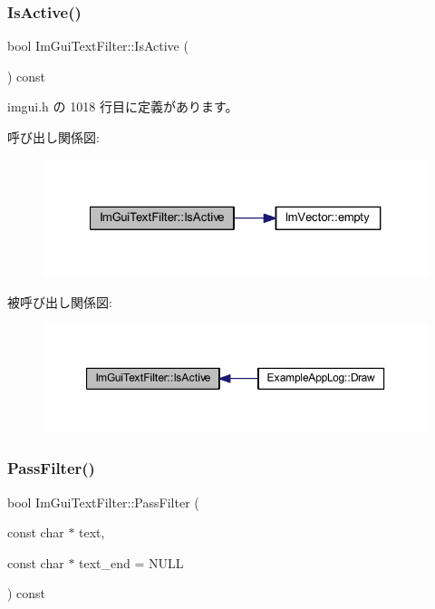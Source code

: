 \subsubsection{\texorpdfstring{Is\+Active()}{IsActive()}}
{\footnotesize\ttfamily bool Im\+Gui\+Text\+Filter\+::\+Is\+Active (\begin{DoxyParamCaption}{ }\end{DoxyParamCaption}) const\hspace{0.3cm}{\ttfamily [inline]}}



 imgui.\+h の 1018 行目に定義があります。

呼び出し関係図\+:\nopagebreak
\begin{figure}[H]
\begin{center}
\leavevmode
\includegraphics[width=327pt]{struct_im_gui_text_filter_a493158f2ab8f45fcf303c3f953be9b88_cgraph}
\end{center}
\end{figure}
被呼び出し関係図\+:\nopagebreak
\begin{figure}[H]
\begin{center}
\leavevmode
\includegraphics[width=350pt]{struct_im_gui_text_filter_a493158f2ab8f45fcf303c3f953be9b88_icgraph}
\end{center}
\end{figure}
\mbox{\label{struct_im_gui_text_filter_a88d73ff8b81fbbd0a129b1bf3498d8aa}} 
\subsubsection{\texorpdfstring{Pass\+Filter()}{PassFilter()}}
{\footnotesize\ttfamily bool Im\+Gui\+Text\+Filter\+::\+Pass\+Filter (\begin{DoxyParamCaption}\item[{const char $\ast$}]{text,  }\item[{const char $\ast$}]{text\+\_\+end = {\ttfamily NULL} }\end{DoxyParamCaption}) const}



